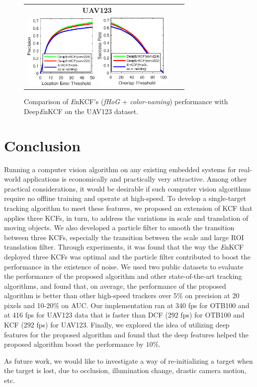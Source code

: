 \documentclass[10pt,twocolumn,letterpaper]{article}
\begin{document}
\begin{figure}[!h]
\centering
\begin{tabular}{ccc}
\tiny\quad\quad\textbf{UAV123}\\
\includegraphics[width=3.60cm]{./figures/pr_deep.eps}
\includegraphics[width=3.70cm]{./figures/sr_deep.eps}\\
\end{tabular}
\caption{Comparison of {\it E}nKCF's ({\it fHoG} + {\it color-naming}) performance with Deep{\it E}nKCF on the UAV123
dataset.}
\label{fig:UAV123_DATASET_DeepFeatures}
\end{figure}

\section{Conclusion} \label{sc:Conclusion}
Running a computer vision algorithm on any existing embedded systems
for real-world applications is economically and practically very
attractive. Among other practical considerations, it would be
desirable if such computer vision algorithms require no offline
training and operate at high-speed. To develop a single-target
tracking algorithm to meet these features, we proposed an extension
of KCF that applies three KCFs, in turn, to address the variations in
scale and translation of moving objects. We also developed a particle
filter to smooth the transition between three KCFs, especially the
transition between the scale and large ROI translation filter. Through
experiments, it was found that the way the {\it E}nKCF deployed three KCFs
was optimal and the particle filter contributed to boost the
performance in the existence of noise. 
We used two public datasets to evaluate the performance
of the proposed algorithm and other state-of-the-art tracking
algorithms, and found that, on average, the performance of the
proposed algorithm is better than other high-speed trackers over 5\%
on precision at 20 pixels and 10-20\% on AUC. Our implementation ran
at 340 fps for OTB100 and at 416 fps for UAV123 data that is faster
than DCF (292 fps) for OTB100 and KCF (292 fps) for UAV123. Finally,
we explored the idea of utilizing deep features for the proposed
algorithm and found that the deep features helped the proposed
algorithm boost the performance by $10\%$.

As future work, we would like to investigate a way of re-initializing
a target when the target is lost, due to occlusion, illumination
change, drastic camera motion, etc.

{\small


}
\end{document}
